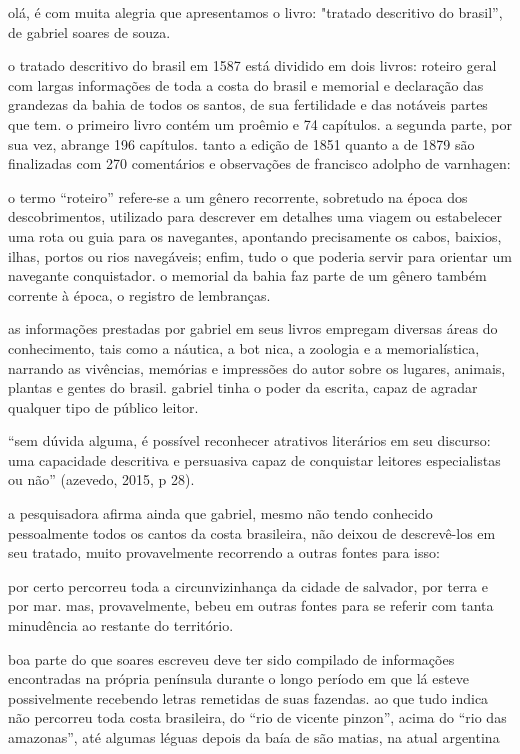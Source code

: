 olá,
é com muita alegria que apresentamos o
livro: 
"tratado descritivo do brasil”, de gabriel soares de souza.

o tratado descritivo do brasil em 1587 está dividido em dois livros: roteiro geral com largas informações de toda a costa do brasil e memorial e declaração das grandezas da bahia de todos os santos, de sua fertilidade e das notáveis partes que tem. o primeiro livro contém um proêmio e 74 capítulos. a segunda parte, por sua vez, abrange 196 capítulos. tanto a edição de 1851 quanto a de 1879 são finalizadas com 270 comentários e observações de francisco adolpho de varnhagen:

o termo “roteiro” refere-se a um gênero recorrente, sobretudo na época dos descobrimentos, utilizado para descrever em detalhes uma viagem ou estabelecer uma rota ou guia para os navegantes, apontando precisamente os cabos, baixios, ilhas, portos ou rios navegáveis; enfim, tudo o que poderia servir para orientar um navegante conquistador. o memorial da bahia faz parte de um gênero também corrente à época, o registro de lembranças.

as informações prestadas por gabriel em seus livros empregam diversas áreas do conhecimento, tais como a náutica, a bot nica, a zoologia e a memorialística, narrando as vivências, memórias e impressões do autor sobre os lugares, animais, plantas e gentes do brasil. gabriel tinha o poder da escrita, capaz de agradar qualquer tipo de público leitor.

“sem dúvida alguma, é possível reconhecer atrativos literários em seu discurso: uma capacidade descritiva e persuasiva capaz de conquistar leitores especialistas ou não” (azevedo, 2015, p 28).

a pesquisadora afirma ainda que gabriel, mesmo não tendo conhecido pessoalmente todos os cantos da costa brasileira, não deixou de descrevê-los em seu tratado, muito provavelmente recorrendo a outras fontes para isso:

por certo percorreu toda a circunvizinhança da cidade de salvador, por terra e por mar. mas, provavelmente, bebeu em outras fontes para se referir com tanta minudência ao restante do território.

boa parte do que soares escreveu deve ter sido compilado de informações encontradas na própria península durante o longo período em que lá esteve possivelmente recebendo letras remetidas de suas fazendas. ao que tudo indica não percorreu toda costa brasileira, do “rio de vicente pinzon”, acima do “rio das amazonas”, até algumas léguas depois da baía de são matias, na atual argentina

